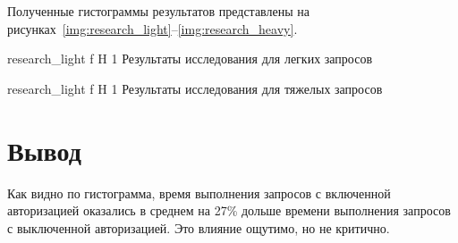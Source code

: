 Полученные гистограммы результатов представлены на рисунках~\ref{img:research_light}--\ref{img:research_heavy}. 

    {research_light}
    {f}
    {H}
    {1\textwidth}
    {Результаты исследования для легких запросов}
    
    {research_light}
    {f}
    {H}
    {1\textwidth}
    {Результаты исследования для тяжелых запросов}

\section*{Вывод}
Как видно по гистограмма, время выполнения запросов с включенной авторизацией оказались в среднем на 27\% дольше времени выполнения запросов с выключенной авторизацией. Это влияние ощутимо, но не критично.
